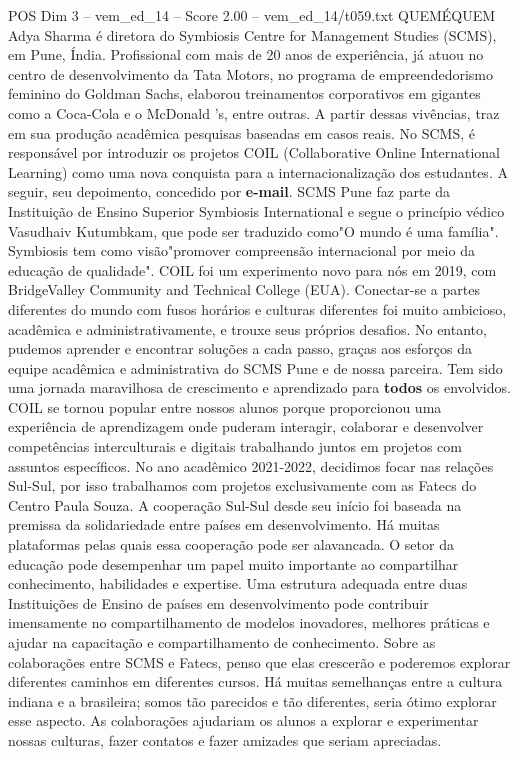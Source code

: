 \begin{textsample}{POS Dim 3 – vem\_ed\_14 – Score 2.00 – vem\_ed\_14/t059.txt}  \label{ex:f3_pos_033}
QUEMÉQUEM Adya Sharma é diretora do Symbiosis Centre for Management Studies (SCMS), em Pune, Índia.
Profissional com mais de 20 anos de experiência, já atuou no centro de desenvolvimento da Tata Motors, no programa de empreendedorismo feminino do Goldman Sachs, elaborou treinamentos corporativos em gigantes como a Coca-Cola e o McDonald 's, entre outras.
A partir dessas vivências, traz em sua produção acadêmica pesquisas baseadas em casos reais.
No SCMS, é responsável por introduzir os projetos COIL (Collaborative Online International Learning) como uma nova conquista para a internacionalização dos estudantes.
A seguir, seu depoimento, concedido por \textbf{e-mail}.
SCMS Pune faz parte da Instituição de Ensino Superior Symbiosis International e segue o princípio védico Vasudhaiv Kutumbkam, que pode ser traduzido como"O mundo é uma família".
Symbiosis tem como visão"promover compreensão internacional por meio da educação de qualidade".
COIL foi um experimento novo para nós em 2019, com BridgeValley Community and Technical College (EUA).
Conectar-se a partes diferentes do mundo com fusos horários e culturas diferentes foi muito ambicioso, acadêmica e administrativamente, e trouxe seus próprios desafios.
No entanto, pudemos aprender e encontrar soluções a cada passo, graças aos esforços da equipe acadêmica e administrativa do SCMS Pune e de nossa parceira.
Tem sido uma jornada maravilhosa de crescimento e aprendizado para \textbf{todos} os envolvidos.
COIL se tornou popular entre nossos alunos porque proporcionou uma experiência de aprendizagem onde puderam interagir, colaborar e desenvolver competências interculturais e digitais trabalhando juntos em projetos com assuntos específicos.
No ano acadêmico 2021-2022, decidimos focar nas relações Sul-Sul, por isso trabalhamos com projetos exclusivamente com as Fatecs do Centro Paula Souza.
A cooperação Sul-Sul desde seu início foi baseada na premissa da solidariedade entre países em desenvolvimento.
Há muitas plataformas pelas quais essa cooperação pode ser alavancada.
O setor da educação pode desempenhar um papel muito importante ao compartilhar conhecimento, habilidades e expertise.
Uma estrutura adequada entre duas Instituições de Ensino de países em desenvolvimento pode contribuir imensamente no compartilhamento de modelos inovadores, melhores práticas e ajudar na capacitação e compartilhamento de conhecimento.
Sobre as colaborações entre SCMS e Fatecs, penso que elas crescerão e poderemos explorar diferentes caminhos em diferentes cursos.
Há muitas semelhanças entre a cultura indiana e a brasileira; somos tão parecidos e tão diferentes, seria ótimo explorar esse aspecto.
As colaborações ajudariam os alunos a explorar e experimentar nossas culturas, fazer contatos e fazer amizades que seriam apreciadas.

\end{textsample}
